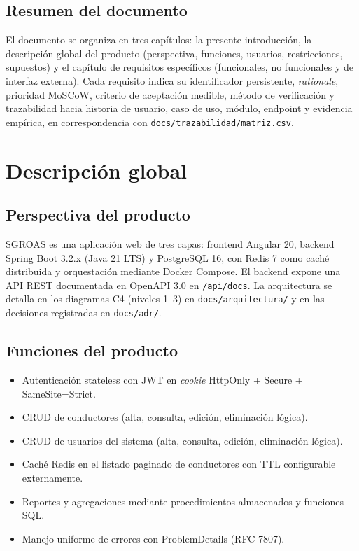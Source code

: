 \documentclass[12pt,a4paper]{article}
\begin{document}
\subsection{Resumen del documento}
\label{sec:resumen}

El documento se organiza en tres capítulos: la presente introducción, la descripción global
del producto (perspectiva, funciones, usuarios, restricciones, supuestos) y el capítulo de
requisitos específicos (funcionales, no funcionales y de interfaz externa). Cada requisito
indica su identificador persistente, \textit{rationale}, prioridad MoSCoW, criterio de
aceptación medible, método de verificación y trazabilidad hacia historia de usuario, caso de
uso, módulo, endpoint y evidencia empírica, en correspondencia con
\texttt{docs/trazabilidad/matriz.csv}.

\section{Descripción global}
\label{sec:descripcion}

\subsection{Perspectiva del producto}
\label{sec:perspectiva}

SGROAS es una aplicación web de tres capas: frontend Angular 20, backend Spring Boot 3.2.x
(Java 21 LTS) y PostgreSQL 16, con Redis 7 como caché distribuida y orquestación mediante
Docker Compose. El backend expone una API REST documentada en OpenAPI 3.0 en \texttt{/api/docs}.
La arquitectura se detalla en los diagramas C4 (niveles 1–3) en \texttt{docs/arquitectura/} y en
las decisiones registradas en \texttt{docs/adr/}.

\subsection{Funciones del producto}
\label{sec:funciones}

\begin{itemize}
  \item Autenticación stateless con JWT en \textit{cookie} HttpOnly + Secure + SameSite=Strict.
  \item CRUD de conductores (alta, consulta, edición, eliminación lógica).
  \item CRUD de usuarios del sistema (alta, consulta, edición, eliminación lógica).
  \item Caché Redis en el listado paginado de conductores con TTL configurable externamente.
  \item Reportes y agregaciones mediante procedimientos almacenados y funciones SQL.
  \item Manejo uniforme de errores con ProblemDetails (RFC 7807).
\end{itemize}
\end{document}
